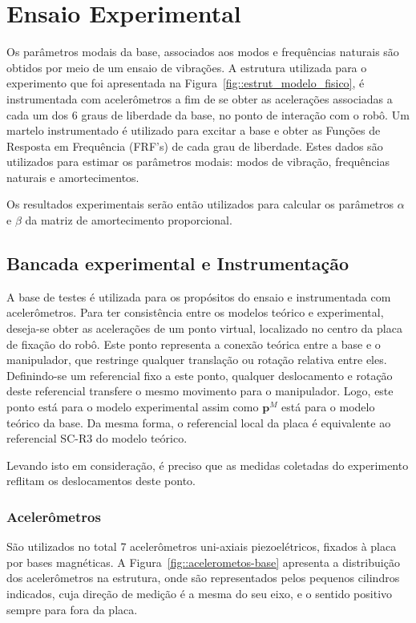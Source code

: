 \section{Ensaio Experimental} \label{sec::experimento}

Os parâmetros modais da base, associados aos modos e frequências naturais são
obtidos por meio de um ensaio de vibrações.
A estrutura utilizada para o experimento que foi apresentada na
Figura~\ref{fig::estrut_modelo_fisico}, é instrumentada com acelerômetros a fim
de se obter as acelerações associadas a cada um dos 6 graus de liberdade da
base, no ponto de interação com o robô. Um martelo instrumentado é utilizado
para excitar a base e obter as Funções de Resposta em Frequência (FRF's) de cada
grau de liberdade. Estes dados são utilizados para estimar os parâmetros modais:
modos de vibração, frequências naturais e amortecimentos.

Os resultados experimentais serão então utilizados para calcular os parâmetros
$\alpha$ e $\beta$ da matriz de amortecimento proporcional.


\subsection{Bancada experimental e Instrumentação}

A base de testes é utilizada para os propósitos do ensaio e instrumentada com
acelerômetros. Para ter consistência entre os modelos teórico e experimental,
deseja-se obter as acelerações de um ponto virtual, localizado no centro da
placa de fixação do robô. Este ponto representa a conexão teórica entre a base e
o manipulador, que restringe qualquer translação ou rotação relativa entre eles.
Definindo-se um referencial fixo a este ponto, qualquer deslocamento e rotação
deste referencial transfere o mesmo movimento para o manipulador. Logo, este
ponto está para o modelo experimental assim como $\mathbf{p}^M$ está para o
modelo teórico da base. Da mesma forma, o referencial local da placa é
equivalente ao referencial SC-R3 do modelo teórico.

Levando isto em consideração, é preciso que as medidas coletadas do experimento
reflitam os deslocamentos deste ponto.

\subsubsection{Acelerômetros}

São utilizados no total 7 acelerômetros uni-axiais piezoelétricos, fixados à
placa por bases magnéticas. A Figura~\ref{fig::acelerometos-base} apresenta a
distribuição dos acelerômetros na estrutura, onde são representados pelos
pequenos cilindros indicados, cuja direção de medição é a mesma do seu eixo, e o
sentido positivo sempre para fora da placa.

